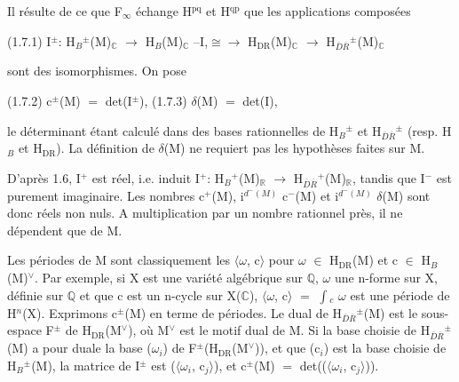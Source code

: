 \documentclass[10pt,twoside]{article}
\begin{document}
Il résulte de ce que F\ensuremath{_{∞}} échange H\ensuremath{^{\mathrm{pq}}} et H\ensuremath{^{\mathrm{qp}}} que les applications composées\par
(1.7.1)    I\ensuremath{^{±}}: H\ensuremath{_{B}}\ensuremath{^{±}}(M)\ensuremath{_{ℂ}} \ensuremath{→} H\ensuremath{_{B}}(M)\ensuremath{_{ℂ}} --I,\ensuremath{≅}\ensuremath{→} H\ensuremath{_{\mathrm{DR}}}(M)\ensuremath{_{ℂ}} \ensuremath{→} H\ensuremath{_{\overline{D}\overline{R}}}\ensuremath{^{±}}(M)\ensuremath{_{ℂ}}\par
sont des isomorphismes. On pose\par
(1.7.2)    c\ensuremath{^{±}}(M) \ensuremath{=} det(I\ensuremath{^{±}}), (1.7.3)    \ensuremath{δ}(M) \ensuremath{=} det(I),\par
le déterminant étant calculé dans des bases rationnelles de H\ensuremath{_{B}}\ensuremath{^{±}} et H\ensuremath{_{\overline{D}\overline{R}}}\ensuremath{^{±}} (resp. H\ensuremath{_{B}} et H\ensuremath{_{\mathrm{DR}}}). La définition de \ensuremath{δ}(M) ne requiert pas les hypothèses faites sur M.\par
D’après 1.6, I\ensuremath{^{+}} est réel, i.e. induit I\ensuremath{^{+}}: H\ensuremath{_{B}}\ensuremath{^{+}}(M)\ensuremath{_{ℝ}} \ensuremath{→} H\ensuremath{_{\overline{D}\overline{R}}}\ensuremath{^{+}}(M)\ensuremath{_{ℝ}}, tandis que I\ensuremath{^{−}} est purement imaginaire. Les nombres c\ensuremath{^{+}}(M), i\ensuremath{^{d^−(M)}} c\ensuremath{^{−}}(M) et i\ensuremath{^{d^−(M)}} \ensuremath{δ}(M) sont donc réels non nuls. A multiplication par un nombre rationnel près, il ne dépendent que de M.\par
Les périodes de M sont classiquement les \ensuremath{⟨}\ensuremath{ω}, c\ensuremath{⟩} pour \ensuremath{ω} \ensuremath{∈} H\ensuremath{_{\mathrm{DR}}}(M) et c \ensuremath{∈} H\ensuremath{_{B}}(M)\ensuremath{^{∨}}. Par exemple, si X est une variété algébrique sur \ensuremath{ℚ}, \ensuremath{ω} une n-forme sur X, définie sur \ensuremath{ℚ} et que c est un n-cycle sur X(\ensuremath{ℂ}), \ensuremath{⟨}\ensuremath{ω}, c\ensuremath{⟩} \ensuremath{=} \ensuremath{∫}\ensuremath{_{c}} \ensuremath{ω} est une période de H\ensuremath{^{n}}(X). Exprimons c\ensuremath{^{±}}(M) en terme de périodes. Le dual de H\ensuremath{_{\overline{D}\overline{R}}}\ensuremath{^{±}}(M) est le sous-espace F\ensuremath{^{±}} de H\ensuremath{_{\mathrm{DR}}}(M\ensuremath{^{∨}}), où M\ensuremath{^{∨}} est le motif dual de M. Si la base choisie de H\ensuremath{_{\overline{D}\overline{R}}}\ensuremath{^{±}}(M) a pour duale la base (\ensuremath{ω}\ensuremath{_{i}}) de F\ensuremath{^{±}}(H\ensuremath{_{\mathrm{DR}}}(M\ensuremath{^{∨}})), et que (c\ensuremath{_{i}}) est la base choisie de H\ensuremath{_{B}}\ensuremath{^{±}}(M), la matrice de I\ensuremath{^{±}} est (\ensuremath{⟨}\ensuremath{ω}\ensuremath{_{i}}, c\ensuremath{_{j}}\ensuremath{⟩}), et c\ensuremath{^{±}}(M) \ensuremath{=} det((\ensuremath{⟨}\ensuremath{ω}\ensuremath{_{i}}, c\ensuremath{_{j}}\ensuremath{⟩})).\par
\end{document}
